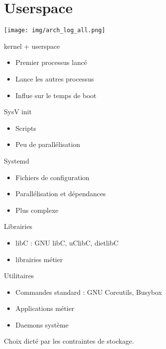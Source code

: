 \section{Userspace}
	\begin{frame}
		\texttt{[image: img/arch\_log\_all.png]}
		\caption{kernel + userspace}
	\end{frame}
	\begin{frame}
		\begin{itemize}
			\item Premier processus lancé
			\item Lance les autres processus
			\item Influe sur le temps de boot
		\end{itemize}
		\begin{block}{SysV init}
			\begin{itemize}
				\item Scripts
				\item Peu de parallélisation
			\end{itemize}
		\end{block}
		\begin{block}{Systemd}
			\begin{itemize}
				\item Fichiers de configuration
				\item Parallélisation et dépendances
				\item Plus complexe
			\end{itemize}
		\end{block}
	\end{frame}

	\begin{frame}
		\begin{block}{Librairies}
			\begin{itemize}
				\item libC : GNU libC, uClibC, dietlibC
				\item librairies métier
			\end{itemize}
		\end{block}
		\begin{block}{Utilitaires}
			\begin{itemize}
				\item Commandes standard : GNU Coreutils, Busybox
				\item Applications métier
				\item Daemons système
			\end{itemize}
		\end{block}
	Choix dicté par les contraintes de stockage.
	\end{frame}

